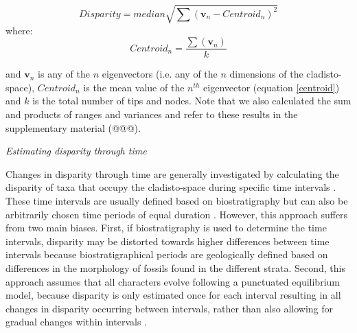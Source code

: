 \documentclass[12pt,letterpaper]{article}
\renewcommand{\subsection}[1]{%
\bigskip
\begin{center}
\begin{large}
\normalfont\itshape #1
\end{large}
\end{center}}
\begin{document}
\begin{equation}
   Disparity=median{\displaystyle\sqrt{\sum{(\mathbf{v}_{n}-Centroid_{n})^2}}}
    \label{disparity}
\end{equation}
where:
\begin{equation}
    Centroid_{n}=\frac{\displaystyle\sum(\mathbf{v}_{n})}{k} 
    \label{centroid}
\end{equation}

\noindent
and $\mathbf{v}_{n}$ is any of the $n$ eigenvectors (i.e. any of the $n$ dimensions of the cladisto-space), $Centroid_{n}$ is the mean value of the $n^{th}$ eigenvector (equation \ref{centroid}) and $k$ is the total number of tips and nodes.
Note that we also calculated the sum and products of ranges and variances and refer to these results in the supplementary material (@@@). %

\subsection{Estimating disparity through time} 
Changes in disparity through time are generally investigated by calculating the disparity of taxa that occupy the cladisto-space during specific time intervals \citep[e.g][]{cisneros2010,prentice2011,Hughes20082013,hopkinsdecoupling2013,bentonmodels2014,bensonfaunal2014}.
These time intervals are usually defined based on biostratigraphy \citep[e.g.][]{cisneros2010,prentice2011,Hughes20082013,bentonmodels2014} but can also be arbitrarily chosen time periods of equal duration \citep{Butler2012,hopkinsdecoupling2013,bensonfaunal2014}.
However, this approach suffers from two main biases. 
First, if biostratigraphy is used to determine the time intervals, disparity may be distorted towards higher differences between time intervals because biostratigraphical periods are geologically defined based on differences in the morphology of fossils found in the different strata.
Second, this approach assumes that all characters evolve following a punctuated equilibrium model, because disparity is only estimated once for each interval resulting in all changes in disparity occurring between intervals, rather than also allowing for gradual changes within intervals \citep{Hunt21042015}.
\end{document}
